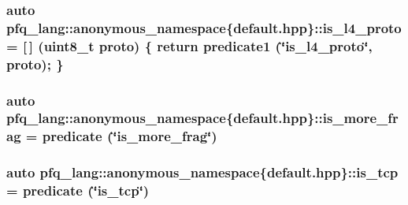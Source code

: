 \hypertarget{namespacepfq__lang_1_1anonymous__namespace_02default_8hpp_03_ac2363f68f819b20eb7afc4acdcdd0bf0}{
\subsubsection[{is\+\_\+l4\+\_\+proto}]{\setlength{\rightskip}{0pt plus 5cm}auto pfq\+\_\+lang\+::anonymous\+\_\+namespace\{default.\+hpp\}\+::is\+\_\+l4\+\_\+proto = \mbox{[}$\,$\mbox{]} (uint8\+\_\+t proto) \{ return {\bf predicate1} (\char`\"{}is\+\_\+l4\+\_\+proto\char`\"{}, proto); \}}}\label{namespacepfq__lang_1_1anonymous__namespace_02default_8hpp_03_ac2363f68f819b20eb7afc4acdcdd0bf0}
\hypertarget{namespacepfq__lang_1_1anonymous__namespace_02default_8hpp_03_a2e8c6d9921b25eecb2a880f73f1beb3c}{
\subsubsection[{is\+\_\+more\+\_\+frag}]{\setlength{\rightskip}{0pt plus 5cm}auto pfq\+\_\+lang\+::anonymous\+\_\+namespace\{default.\+hpp\}\+::is\+\_\+more\+\_\+frag = {\bf predicate} (\char`\"{}is\+\_\+more\+\_\+frag\char`\"{})}}\label{namespacepfq__lang_1_1anonymous__namespace_02default_8hpp_03_a2e8c6d9921b25eecb2a880f73f1beb3c}
\hypertarget{namespacepfq__lang_1_1anonymous__namespace_02default_8hpp_03_a219c50fd572a25336a32e00cf527c565}{
\subsubsection[{is\+\_\+tcp}]{\setlength{\rightskip}{0pt plus 5cm}auto pfq\+\_\+lang\+::anonymous\+\_\+namespace\{default.\+hpp\}\+::is\+\_\+tcp = {\bf predicate} (\char`\"{}is\+\_\+tcp\char`\"{})}}\label{namespacepfq__lang_1_1anonymous__namespace_02default_8hpp_03_a219c50fd572a25336a32e00cf527c565}
